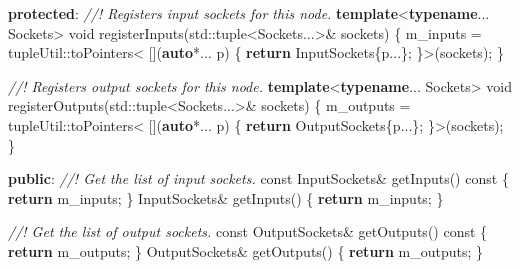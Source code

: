 \documentclass[
  12pt,
  british,
  paper=a4,
  twoside,
  titlepage=true,
  openright,
  abstract=on,
  toc=listofnumbered,
  numbers=noenddot,
  chapterprefix=true,
  headings=optiontohead,
  svgnames,
  dvipsnames]{scrreprt}
\newenvironment{Shaded}{}{}
\newcommand{\AttributeTok}[1]{\textcolor[rgb]{0.49,0.56,0.16}{#1}}
\newcommand{\BuiltInTok}[1]{#1}
\newcommand{\CommentTok}[1]{\textcolor[rgb]{0.38,0.63,0.69}{\textit{#1}}}
\newcommand{\ControlFlowTok}[1]{\textcolor[rgb]{0.00,0.44,0.13}{\textbf{#1}}}
\newcommand{\DataTypeTok}[1]{\textcolor[rgb]{0.56,0.13,0.00}{#1}}
\newcommand{\KeywordTok}[1]{\textcolor[rgb]{0.00,0.44,0.13}{\textbf{#1}}}
\newcommand{\NormalTok}[1]{#1}
\newcommand{\OperatorTok}[1]{\textcolor[rgb]{0.40,0.40,0.40}{#1}}
\newcommand{\VariableTok}[1]{\textcolor[rgb]{0.10,0.09,0.49}{#1}}
\begin{document}
\begin{Shaded}
\begin{Highlighting}[numbers=left,,]
\KeywordTok{protected}\OperatorTok{:}
    \CommentTok{//! Registers input sockets for this node.}
    \KeywordTok{template}\OperatorTok{\textless{}}\KeywordTok{typename}\OperatorTok{...}\NormalTok{ Sockets}\OperatorTok{\textgreater{}}
    \DataTypeTok{void}\NormalTok{ registerInputs}\OperatorTok{(}\BuiltInTok{std::}\NormalTok{tuple}\OperatorTok{\textless{}}\NormalTok{Sockets}\OperatorTok{...\textgreater{}\&}\NormalTok{ sockets}\OperatorTok{)}
    \OperatorTok{\{}
        \VariableTok{m\_inputs} \OperatorTok{=}\NormalTok{ tupleUtil}\OperatorTok{::}\NormalTok{toPointers}\OperatorTok{\textless{}}
            \OperatorTok{[](}\KeywordTok{auto}\OperatorTok{*...}\NormalTok{ p}\OperatorTok{)} \OperatorTok{\{} \ControlFlowTok{return}\NormalTok{ InputSockets}\OperatorTok{\{}\NormalTok{p}\OperatorTok{...\};} \OperatorTok{\}\textgreater{}(}\NormalTok{sockets}\OperatorTok{);}
    \OperatorTok{\}}

    \CommentTok{//! Registers output sockets for this node.}
    \KeywordTok{template}\OperatorTok{\textless{}}\KeywordTok{typename}\OperatorTok{...}\NormalTok{ Sockets}\OperatorTok{\textgreater{}}
    \DataTypeTok{void}\NormalTok{ registerOutputs}\OperatorTok{(}\BuiltInTok{std::}\NormalTok{tuple}\OperatorTok{\textless{}}\NormalTok{Sockets}\OperatorTok{...\textgreater{}\&}\NormalTok{ sockets}\OperatorTok{)}
    \OperatorTok{\{}
        \VariableTok{m\_outputs} \OperatorTok{=}\NormalTok{ tupleUtil}\OperatorTok{::}\NormalTok{toPointers}\OperatorTok{\textless{}}
            \OperatorTok{[](}\KeywordTok{auto}\OperatorTok{*...}\NormalTok{ p}\OperatorTok{)} \OperatorTok{\{} \ControlFlowTok{return}\NormalTok{ OutputSockets}\OperatorTok{\{}\NormalTok{p}\OperatorTok{...\};} \OperatorTok{\}\textgreater{}(}\NormalTok{sockets}\OperatorTok{);}
    \OperatorTok{\}}

\KeywordTok{public}\OperatorTok{:}
    \CommentTok{//! Get the list of input sockets.}
    \AttributeTok{const}\NormalTok{ InputSockets}\OperatorTok{\&}\NormalTok{ getInputs}\OperatorTok{()} \AttributeTok{const} \OperatorTok{\{} \ControlFlowTok{return} \VariableTok{m\_inputs}\OperatorTok{;} \OperatorTok{\}}
\NormalTok{    InputSockets}\OperatorTok{\&}\NormalTok{ getInputs}\OperatorTok{()} \OperatorTok{\{} \ControlFlowTok{return} \VariableTok{m\_inputs}\OperatorTok{;} \OperatorTok{\}}

    \CommentTok{//! Get the list of output sockets.}
    \AttributeTok{const}\NormalTok{ OutputSockets}\OperatorTok{\&}\NormalTok{ getOutputs}\OperatorTok{()} \AttributeTok{const} \OperatorTok{\{} \ControlFlowTok{return} \VariableTok{m\_outputs}\OperatorTok{;} \OperatorTok{\}}
\NormalTok{    OutputSockets}\OperatorTok{\&}\NormalTok{ getOutputs}\OperatorTok{()} \OperatorTok{\{} \ControlFlowTok{return} \VariableTok{m\_outputs}\OperatorTok{;} \OperatorTok{\}}


\end{Highlighting}
\end{Shaded}
\end{document}
